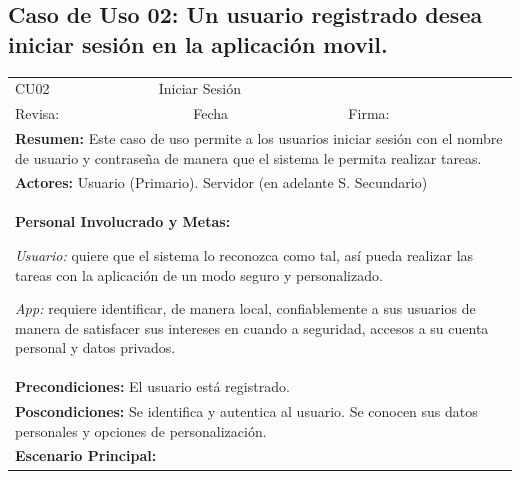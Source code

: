 		\subsection{Caso de Uso 02: Un usuario registrado desea iniciar sesión en la aplicación movil.}
			\begin{longtable}{|l|p{5.5cm}|l|p{2cm}|l|p{1.9cm}|} \hline
				\cellcolor{grisOscuro} CU02 & \multicolumn{4}{|l|}{  \cellcolor{grisOscuro} Iniciar Sesión} &  \cellcolor{grisClaro}\multirow{2}{1cm}{} \\ \cline{1-5}
				\cellcolor{grisOscuro} Revisa: &  \cellcolor{grisClaro} &  \cellcolor{grisOscuro} Fecha &  \cellcolor{grisClaro} &  \cellcolor{grisOscuro} Firma: & \cellcolor{grisClaro} \\ \hline
				\multicolumn{6}{|p{15cm}|}{ \textbf{Resumen: } Este caso de uso permite a los usuarios iniciar sesión con el nombre de usuario y contraseña de manera que el sistema le permita realizar tareas.

				} \\ \hline

				\multicolumn{6}{|p{15cm}|}{ \textbf{Actores: } Usuario (Primario). Servidor (en adelante S. Secundario)

				} \\ \hline

				\multicolumn{6}{|p{15cm}|}{ \textbf{Personal Involucrado y Metas: }

				\emph{Usuario:} quiere que el sistema lo reconozca como tal, así pueda realizar las tareas con la aplicación de un modo seguro y personalizado.

				\emph{App:} requiere identificar, de manera local, confiablemente a sus usuarios de manera de satisfacer sus intereses en cuando a seguridad, accesos a su cuenta personal y datos privados.

				} \\ \hline

				\multicolumn{6}{|p{15cm}|}{ \textbf{Precondiciones: } El usuario está registrado.

				} \\ \hline

				\multicolumn{6}{|p{15cm}|}{ \textbf{Poscondiciones: } Se identifica y autentica al usuario. Se conocen sus datos personales y opciones de personalización.

				} \\ \hline

				\multicolumn{6}{|p{15cm}|}{ \textbf{Escenario Principal: }

}
\end{longtable}
